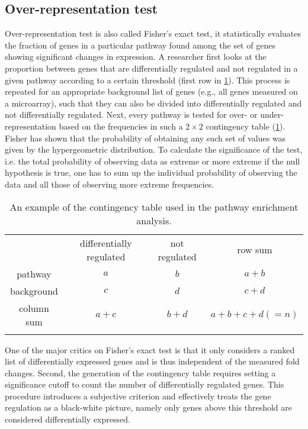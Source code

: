 \subsection{Over-representation test}
Over-representation test is also called Fisher's exact test, it statistically 
evaluates the fraction of genes in a particular pathway found among the set 
of genes showing significant changes in expression. 
A researcher first looks at the proportion between genes 
that are 
differentially regulated and not regulated in a given 
pathway according to a certain 
threshold (first row in \ref{table:contigency_table}). 
This process is repeated for an appropriate background 
list of genes (e.g., all genes measured on a microarray), 
such that they can also be divided into differentially 
regulated and not differentially regulated. 
Next, every pathway 
is tested for over- or under-representation based on the frequencies in such 
a $2 \times 2$ contingency table (\ref{table:contigency_table}). 
Fisher has shown that the probability of obtaining any such set of values was 
given by the hypergeometric distribution. To calculate the significance of the
test, i.e. the total probability of observing data as extreme or more extreme 
if the null hypothesis is true, one has to sum up the individual probability
of observing the data and all those of observing more extreme frequencies.

\begin{longtable}{cccc}
\caption[Contingency table example]{
An example of the contingency table used in the pathway enrichment analysis.} \\
\hline
& differentially regulated & not regulated & row sum \\
\rowcolor{Gray} pathway & $a$ & $b$ & $a+b$\\
background & $c$ & $d$ & $c+d$\\
\rowcolor{Gray} column sum & $a+c$ & $b+d$ & $a+b+c+d(=n)$\\
\hline
\label{table:contigency_table}
\end{longtable}

One of the major critics on Fisher's exact test is that it only considers a ranked
list of differentially expressed genes and is thus independent of the 
measured fold changes. Second, the generation of the contingency table
requires setting a significance cutoff to count the number of differentially
regulated genes. This procedure introduces a subjective criterion and 
effectively treats the gene regulation as a black-white picture, namely only 
genes above this threshold are considered differentially expressed.
    
